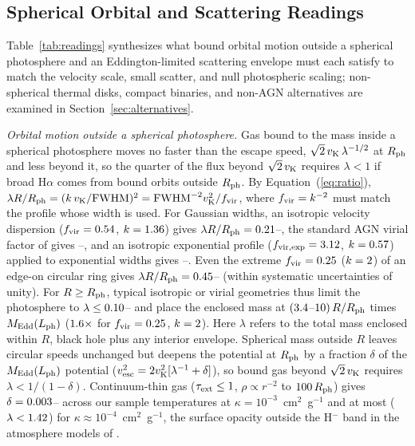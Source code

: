 \documentclass[twocolumn,linenumbers]{aastex701}
\newcommand{\Ha}{H$\alpha$}
\newcommand{\Lph}{L_{\rm ph}}
\newcommand{\Rph}{R_{\rm ph}}
\newcommand{\vK}{v_{\rm K}}
\begin{document}
\subsection{Spherical Orbital and Scattering Readings} \label{sec:readings}

Table~\ref{tab:readings} synthesizes what bound orbital motion outside a spherical photosphere and an Eddington-limited scattering envelope must each satisfy to match the velocity scale, small scatter, and null photospheric scaling; non-spherical thermal disks, compact binaries, and non-AGN alternatives are examined in Section~\ref{sec:alternatives}.



\emph{Orbital motion outside a spherical photosphere.}
Gas bound to the mass inside a spherical photosphere moves no faster than the escape speed, $\sqrt{2}\,\vK\,\lambda^{-1/2}$ at $\Rph$ and less beyond it, so the quarter of the flux beyond $\sqrt{2}\,\vK$ requires $\lambda<1$ if broad \Ha{} comes from bound orbits outside $\Rph$.
By Equation~(\ref{eq:ratio}), $\lambda R/\Rph=(k\,\vK/{\rm FWHM})^{2}={\rm FWHM}^{-2}\vK^{2}/f_{\rm vir}$, where $f_{\rm vir}=k^{-2}$ must match the profile whose width is used.
For Gaussian widths, an isotropic velocity dispersion ($f_{\rm vir}=0.54$, $k=1.36{}$) gives $\lambda R/\Rph=\lamIsoLo{}$--\lamIsoHi{}, the standard AGN virial factor of \citet[$f_{\rm vir}=1.08$, $k=\kVir{}$]{ReinesVolonteri2015} gives \lamVirLo{}--\lamVirHi{}, and an isotropic exponential profile ($f_{\rm vir,{\rm exp}}=3.12$, $k=0.57{}$) applied to exponential widths gives \lamIsoExpLo{}--\lamIsoExpHi{}.
Even the extreme $f_{\rm vir}=0.25$ ($k=2{}$) of an edge-on circular ring gives $\lambda R/\Rph=\lamRingLo{}$--\lamRingHi{} (within systematic uncertainties of unity).
For $R\geq\Rph$, typical isotropic or virial geometries thus limit the photosphere to $\lambda\leq0.10{}$--\lamIsoHi{} and place the enclosed mass at $(3.4{}$--$\mEddHi{})\,R/\Rph$ times $M_{\rm Edd}(\Lph)$ ($1.6{}\times$ for $f_{\rm vir}=0.25$, $k=2{}$).
Here $\lambda$ refers to the total mass enclosed within $R$, black hole plus any interior envelope.
Spherical mass outside $R$ leaves circular speeds unchanged but deepens the potential at $\Rph$ by a fraction $\delta$ of the $M_{\rm Edd}(\Lph)$ potential ($v_{\rm esc}^{2}=2\vK^{2}[\lambda^{-1}+\delta]$), so bound gas beyond $\sqrt{2}\,\vK$ requires $\lambda<1/(1-\delta)$.
Continuum-thin gas ($\tau_{\rm ext}\leq1$, $\rho\propto r^{-2}$ to $\rOutRph{}\,\Rph$) gives $\delta=0.003{}$--\deltaKthreeHi{} across our sample temperatures at $\kappa=10^{-3}$~cm$^{2}$~g$^{-1}$ and at most \deltaKfourMax{} ($\lambda<1.42{}$) for $\kappa\approx10^{-4}$~cm$^{2}$~g$^{-1}$, the surface opacity outside the H$^{-}$ band in the atmosphere models of \citet[][Appendix~A]{Curtis2026}.
\end{document}
